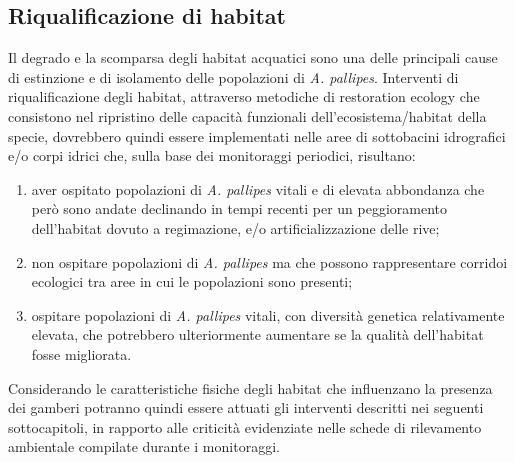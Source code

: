 \documentclass[11pt,a4paper,italian,twoside,openany]{memoir}
\begin{document}
\subsection{Riqualificazione di habitat} 
\label{sub_riqhab}
Il degrado e la scomparsa degli habitat acquatici sono una delle principali cause di estinzione e di isolamento delle popolazioni di \emph{A. pallipes}. Interventi di riqualificazione degli habitat, attraverso metodiche di restoration ecology che consistono nel ripristino delle capacità funzionali dell'ecosistema/habitat della specie, dovrebbero quindi essere implementati nelle aree di sottobacini idrografici e/o corpi idrici che, sulla base dei monitoraggi periodici, risultano:
\begin{enumerate}
  \item aver ospitato popolazioni di \emph{A. pallipes} vitali e di elevata abbondanza che però sono andate declinando in tempi recenti per un peggioramento dell'habitat dovuto a regimazione, e/o artificializzazione delle rive;
  \item non ospitare popolazioni di \emph{A. pallipes} ma che possono rappresentare corridoi ecologici tra aree in cui le popolazioni sono presenti; 
  \item ospitare popolazioni di \emph{A. pallipes} vitali, con diversità genetica relativamente elevata, che potrebbero ulteriormente aumentare se la qualità dell'habitat fosse migliorata.
\end{enumerate}

Considerando le caratteristiche fisiche degli habitat che influenzano la presenza dei gamberi potranno quindi essere attuati gli interventi descritti nei seguenti sottocapitoli, in rapporto alle criticità evidenziate nelle schede di rilevamento ambientale compilate durante i monitoraggi.
\end{document}
